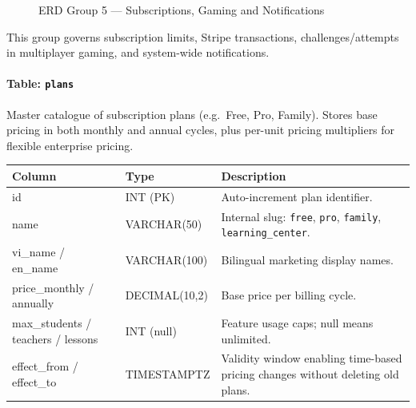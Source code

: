 \begin{figure}[H]
{
}
\caption{ERD Group 5 --- Subscriptions, Gaming and Notifications}
\label{fig:erd-subscription}
\end{figure}

This group governs subscription limits, Stripe transactions, challenges/attempts in multiplayer gaming, and system-wide notifications.

\paragraph{Table: \texttt{plans}}
Master catalogue of subscription plans (e.g.\ Free, Pro, Family). Stores base pricing in both monthly and annual cycles, plus per-unit pricing multipliers for flexible enterprise pricing.

\begin{longtable}{|p{4.5cm}|p{3cm}|p{6cm}|}
\hline \textbf{Column} & \textbf{Type} & \textbf{Description} \\ \hline
id & INT (PK) & Auto-increment plan identifier. \\ \hline
name & VARCHAR(50) & Internal slug: \texttt{free}, \texttt{pro}, \texttt{family}, \texttt{learning\_center}. \\ \hline
vi\_name / en\_name & VARCHAR(100) & Bilingual marketing display names. \\ \hline
price\_monthly / annually & DECIMAL(10,2) & Base price per billing cycle. \\ \hline
max\_students / teachers / lessons & INT (null) & Feature usage caps; null means unlimited. \\ \hline
effect\_from / effect\_to & TIMESTAMPTZ & Validity window enabling time-based pricing changes without deleting old plans. \\ \hline
\end{longtable}

